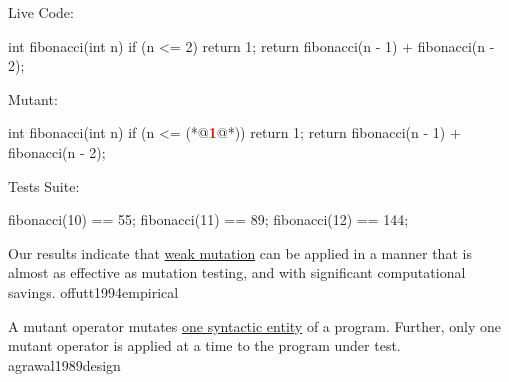 \documentclass{article}
\begin{document}
\begin{pptWide}{3}
Live Code:\par
{\small\begin{ffcode}
int fibonacci(int n) {
  if (n <= 2) {
    return 1;
  }
  return fibonacci(n - 1)
    + fibonacci(n - 2);
}
\end{ffcode}
}
\par\columnbreak\par
Mutant:\par
{\small\begin{ffcode}
int fibonacci(int n) {
  if (n <= (*@\textcolor{red}{\textbf{1}}@*)) {
    return 1;
  }
  return fibonacci(n - 1)
    + fibonacci(n - 2);
}
\end{ffcode}
}
\par\columnbreak\par
Tests Suite:\par
{\small\begin{ffcode}
fibonacci(10) == 55;
fibonacci(11) == 89;
fibonacci(12) == 144;
\end{ffcode}
}
\end{pptWide}
\plush{}

  {Our results indicate that \ul{weak mutation} can be applied in a manner that is almost as effective as mutation testing, and with significant computational savings.}
  {offutt1994empirical}

  {A mutant operator mutates \ul{one syntactic entity} of a program. Further, only one mutant operator
is applied at a time to the program under test.}
  {agrawal1989design}

\end{document}
